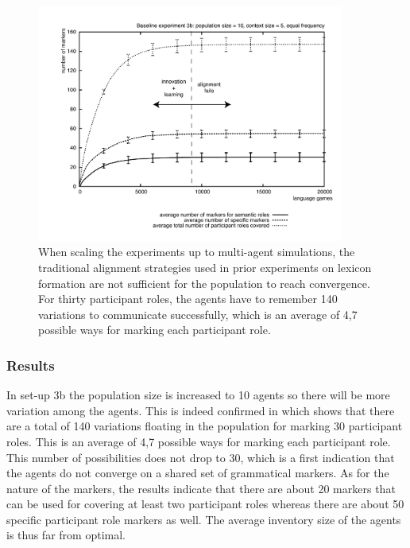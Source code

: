 \begin{figure}[ht]
\centerline{\includegraphics[width=0.9\textwidth]{Chapter3/figs/graph-base3-size3b}}
  \caption[Baseline experiment 3b: number of markers]{When scaling the experiments up to multi-agent simulations, the traditional alignment strategies used in prior experiments on lexicon formation are not sufficient for the population to reach convergence. For thirty participant roles, the agents have to remember 140 variations to communicate successfully, which is an average of 4,7 possible ways for marking each participant role.}
   \label{f:base3-size3b}
\end{figure}

\subsubsection{Results}
 In set-up 3b the population size is increased to 10 agents so there will be more variation among the agents. This is indeed confirmed in  which shows that there are a total of 140 variations floating in the population for marking 30 participant roles. This is an average of 4,7 possible ways for marking each participant role. This number of possibilities does not drop to 30, which is a first indication that the agents do not converge on a shared set of grammatical markers. As for the nature of the markers, the results indicate that there are about 20 markers that can be used for covering at least two participant roles whereas there are about 50 specific participant role markers as well. The average inventory size of the agents is thus far from optimal.

